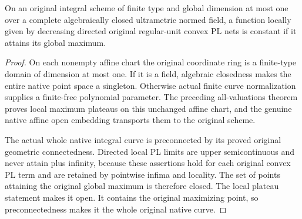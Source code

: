 \begin{theorem}
\label{thm:fc-integral-curve-directed-maximum}
\leanok
{}
On an original integral scheme of finite type and global dimension at most
one over a complete algebraically closed ultrametric normed field, a function
locally given by decreasing directed original regular-unit convex PL nets is
constant if it attains its global maximum.
\end{theorem}
\begin{proof}
On each nonempty affine chart the original coordinate ring is a finite-type
domain of dimension at most one. If it is a field, algebraic closedness makes
the entire native point space a singleton. Otherwise actual finite curve
normalization supplies a finite-free polynomial parameter. The preceding
all-valuations theorem proves local maximum plateaus on this unchanged affine
chart, and the genuine native affine open embedding transports them to the
original scheme.

The actual whole native integral curve is preconnected by its proved original
geometric connectedness. Directed local PL limits are upper semicontinuous
and never attain plus infinity, because these assertions hold for each
original convex PL term and are retained by pointwise infima and locality.
The set of points attaining the original global maximum is therefore closed.
The local plateau statement makes it open. It contains the original maximizing
point, so preconnectedness makes it the whole original native curve.
\end{proof}


